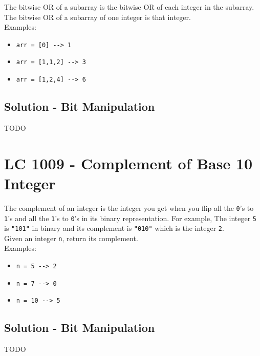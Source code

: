 The bitwise OR of a subarray is the bitwise OR of each integer in the subarray. The bitwise OR of a subarray of one integer is that integer.\\

Examples:
\begin{itemize}
\item {\colorbox{CodeBackground}{\lstinline|arr = [0] --> 1|}}
\item {{\colorbox{CodeBackground}{\lstinline|arr = [1,1,2] --> 3|}}}
\item {\colorbox{CodeBackground}{\lstinline|arr = [1,2,4] --> 6|}}
\end{itemize}

\subsection*{Solution - Bit Manipulation}
TODO

\section{LC 1009 - Complement of Base 10 Integer}
The complement of an integer is the integer you get when you flip all the {\colorbox{CodeBackground}{\lstinline|0|}}'s to {\colorbox{CodeBackground}{\lstinline|1|}}'s and all the {\colorbox{CodeBackground}{\lstinline|1|}}'s to {\colorbox{CodeBackground}{\lstinline|0|}}'s in its binary representation. For example, The integer {\colorbox{CodeBackground}{\lstinline|5|}} is {\colorbox{CodeBackground}{\lstinline|"101"|}} in binary and its complement is {\colorbox{CodeBackground}{\lstinline|"010"|}} which is the integer {\colorbox{CodeBackground}{\lstinline|2|}}.\\

Given an integer {\colorbox{CodeBackground}{\lstinline|n|}}, return its complement.\\

Examples:
\begin{itemize}
\item {\colorbox{CodeBackground}{\lstinline|n = 5 --> 2|}}
\item {\colorbox{CodeBackground}{\lstinline|n = 7 --> 0|}}
\item {\colorbox{CodeBackground}{\lstinline|n = 10 --> 5|}}
\end{itemize}

\subsection*{Solution - Bit Manipulation}
TODO

